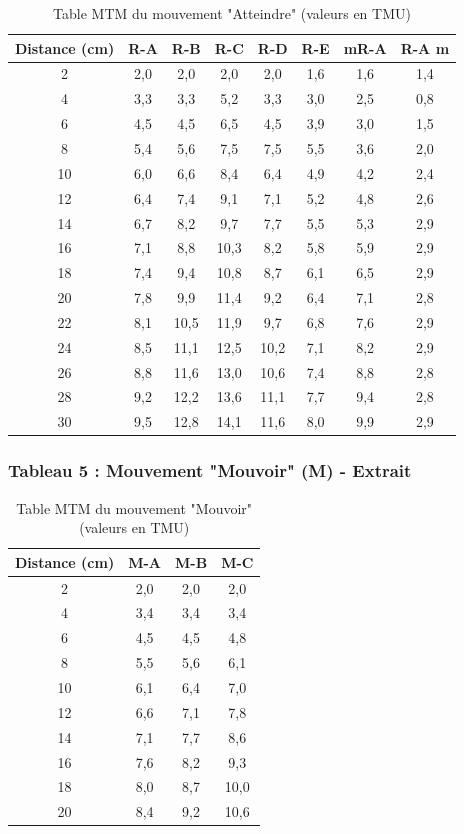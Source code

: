 \documentclass[a4paper,12pt]{article}
\begin{document}
\begin{table}[ht]
\centering
\begin{tabular}{|c|c|c|c|c|c|c|c|}
\hline
\textbf{Distance (cm)} & \textbf{R-A} & \textbf{R-B} & \textbf{R-C} & \textbf{R-D} & \textbf{R-E} & \textbf{mR-A} & \textbf{R-A m} \\
\hline
2 & 2,0 & 2,0 & 2,0 & 2,0 & 1,6 & 1,6 & 1,4 \\
4 & 3,3 & 3,3 & 5,2 & 3,3 & 3,0 & 2,5 & 0,8 \\
6 & 4,5 & 4,5 & 6,5 & 4,5 & 3,9 & 3,0 & 1,5 \\
8 & 5,4 & 5,6 & 7,5 & 7,5 & 5,5 & 3,6 & 2,0 \\
10 & 6,0 & 6,6 & 8,4 & 6,4 & 4,9 & 4,2 & 2,4 \\
12 & 6,4 & 7,4 & 9,1 & 7,1 & 5,2 & 4,8 & 2,6 \\
14 & 6,7 & 8,2 & 9,7 & 7,7 & 5,5 & 5,3 & 2,9 \\
16 & 7,1 & 8,8 & 10,3 & 8,2 & 5,8 & 5,9 & 2,9 \\
18 & 7,4 & 9,4 & 10,8 & 8,7 & 6,1 & 6,5 & 2,9 \\
20 & 7,8 & 9,9 & 11,4 & 9,2 & 6,4 & 7,1 & 2,8 \\
22 & 8,1 & 10,5 & 11,9 & 9,7 & 6,8 & 7,6 & 2,9 \\
24 & 8,5 & 11,1 & 12,5 & 10,2 & 7,1 & 8,2 & 2,9 \\
26 & 8,8 & 11,6 & 13,0 & 10,6 & 7,4 & 8,8 & 2,8 \\
28 & 9,2 & 12,2 & 13,6 & 11,1 & 7,7 & 9,4 & 2,8 \\
30 & 9,5 & 12,8 & 14,1 & 11,6 & 8,0 & 9,9 & 2,9 \\
\hline
\end{tabular}
\caption{Table MTM du mouvement "Atteindre" (valeurs en TMU)}
\end{table}

\subsubsection{Tableau 5 : Mouvement "Mouvoir" (M) - Extrait}

\begin{table}[ht]
\centering
\begin{tabular}{|c|c|c|c|}
\hline
\textbf{Distance (cm)} & \textbf{M-A} & \textbf{M-B} & \textbf{M-C} \\
\hline
2 & 2,0 & 2,0 & 2,0 \\
4 & 3,4 & 3,4 & 3,4 \\
6 & 4,5 & 4,5 & 4,8 \\
8 & 5,5 & 5,6 & 6,1 \\
10 & 6,1 & 6,4 & 7,0 \\
12 & 6,6 & 7,1 & 7,8 \\
14 & 7,1 & 7,7 & 8,6 \\
16 & 7,6 & 8,2 & 9,3 \\
18 & 8,0 & 8,7 & 10,0 \\
20 & 8,4 & 9,2 & 10,6 \\
\hline
\end{tabular}
\caption{Table MTM du mouvement "Mouvoir" (valeurs en TMU)}
\end{table}
\end{document}
